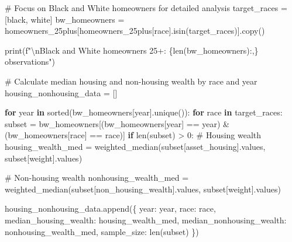 \documentclass[
  letterpaper,
  DIV=11,
  numbers=noendperiod]{scrartcl}
\newenvironment{Shaded}{\begin{snugshade}}{\end{snugshade}}
\newcommand{\BuiltInTok}[1]{\textcolor[rgb]{0.00,0.23,0.31}{#1}}
\newcommand{\CharTok}[1]{\textcolor[rgb]{0.13,0.47,0.30}{#1}}
\newcommand{\CommentTok}[1]{\textcolor[rgb]{0.37,0.37,0.37}{#1}}
\newcommand{\ControlFlowTok}[1]{\textcolor[rgb]{0.00,0.23,0.31}{\textbf{#1}}}
\newcommand{\DecValTok}[1]{\textcolor[rgb]{0.68,0.00,0.00}{#1}}
\newcommand{\KeywordTok}[1]{\textcolor[rgb]{0.00,0.23,0.31}{\textbf{#1}}}
\newcommand{\NormalTok}[1]{\textcolor[rgb]{0.00,0.23,0.31}{#1}}
\newcommand{\OperatorTok}[1]{\textcolor[rgb]{0.37,0.37,0.37}{#1}}
\newcommand{\SpecialCharTok}[1]{\textcolor[rgb]{0.37,0.37,0.37}{#1}}
\newcommand{\SpecialStringTok}[1]{\textcolor[rgb]{0.13,0.47,0.30}{#1}}
\newcommand{\StringTok}[1]{\textcolor[rgb]{0.13,0.47,0.30}{#1}}
\begin{document}
\begin{Shaded}
\begin{Highlighting}[]
\CommentTok{\# Focus on Black and White homeowners for detailed analysis}
\NormalTok{target\_races }\OperatorTok{=}\NormalTok{ [}\StringTok{\textquotesingle{}black\textquotesingle{}}\NormalTok{, }\StringTok{\textquotesingle{}white\textquotesingle{}}\NormalTok{]}
\NormalTok{bw\_homeowners }\OperatorTok{=}\NormalTok{ homeowners\_25plus[homeowners\_25plus[}\StringTok{\textquotesingle{}race\textquotesingle{}}\NormalTok{].isin(target\_races)].copy()}

\BuiltInTok{print}\NormalTok{(}\SpecialStringTok{f"}\CharTok{\textbackslash{}n}\SpecialStringTok{Black and White homeowners 25+: }\SpecialCharTok{\{}\BuiltInTok{len}\NormalTok{(bw\_homeowners)}\SpecialCharTok{:,\}}\SpecialStringTok{ observations"}\NormalTok{)}

\CommentTok{\# Calculate median housing and non{-}housing wealth by race and year}
\NormalTok{housing\_nonhousing\_data }\OperatorTok{=}\NormalTok{ []}

\ControlFlowTok{for}\NormalTok{ year }\KeywordTok{in} \BuiltInTok{sorted}\NormalTok{(bw\_homeowners[}\StringTok{\textquotesingle{}year\textquotesingle{}}\NormalTok{].unique()):}
    \ControlFlowTok{for}\NormalTok{ race }\KeywordTok{in}\NormalTok{ target\_races:}
\NormalTok{        subset }\OperatorTok{=}\NormalTok{ bw\_homeowners[(bw\_homeowners[}\StringTok{\textquotesingle{}year\textquotesingle{}}\NormalTok{] }\OperatorTok{==}\NormalTok{ year) }\OperatorTok{\&}\NormalTok{ (bw\_homeowners[}\StringTok{\textquotesingle{}race\textquotesingle{}}\NormalTok{] }\OperatorTok{==}\NormalTok{ race)]}
        \ControlFlowTok{if} \BuiltInTok{len}\NormalTok{(subset) }\OperatorTok{\textgreater{}} \DecValTok{0}\NormalTok{:}
            \CommentTok{\# Housing wealth}
\NormalTok{            housing\_wealth\_med }\OperatorTok{=}\NormalTok{ weighted\_median(subset[}\StringTok{\textquotesingle{}asset\_housing\textquotesingle{}}\NormalTok{].values, subset[}\StringTok{\textquotesingle{}weight\textquotesingle{}}\NormalTok{].values)}
            
            \CommentTok{\# Non{-}housing wealth}
\NormalTok{            nonhousing\_wealth\_med }\OperatorTok{=}\NormalTok{ weighted\_median(subset[}\StringTok{\textquotesingle{}non\_housing\_wealth\textquotesingle{}}\NormalTok{].values, subset[}\StringTok{\textquotesingle{}weight\textquotesingle{}}\NormalTok{].values)}
            
\NormalTok{            housing\_nonhousing\_data.append(\{}
                \StringTok{\textquotesingle{}year\textquotesingle{}}\NormalTok{: year,}
                \StringTok{\textquotesingle{}race\textquotesingle{}}\NormalTok{: race,}
                \StringTok{\textquotesingle{}median\_housing\_wealth\textquotesingle{}}\NormalTok{: housing\_wealth\_med,}
                \StringTok{\textquotesingle{}median\_nonhousing\_wealth\textquotesingle{}}\NormalTok{: nonhousing\_wealth\_med,}
                \StringTok{\textquotesingle{}sample\_size\textquotesingle{}}\NormalTok{: }\BuiltInTok{len}\NormalTok{(subset)}
\NormalTok{            \})}


\end{Highlighting}
\end{Shaded}
\end{document}
